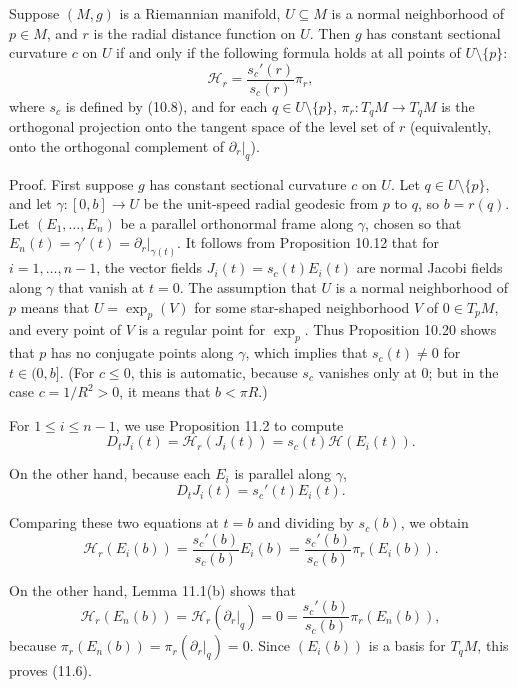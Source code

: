 \begin{proposition}[]
\label{prop:hessian-radial-distance-constant-curvature}
Suppose $(M, g)$ is a Riemannian manifold, $U \subseteq M$ is a normal neighborhood of $p \in M$, and $r$ is the radial distance function on $U$. Then $g$ has constant sectional curvature $c$ on $U$ if and only if the following formula holds at all points of $U \setminus \{p\}$:
\begin{equation}
\mathcal{H}_r = \frac{s_c'(r)}{s_c(r)}\pi_r, \tag{11.6}
\end{equation}
where $s_c$ is defined by (10.8), and for each $q \in U \setminus \{p\}$, $\pi_r : T_q M \to T_q M$ is the orthogonal projection onto the tangent space of the level set of $r$ (equivalently, onto the orthogonal complement of $\partial_r|_q$).
\end{proposition}

Proof. First suppose $g$ has constant sectional curvature $c$ on $U$. Let $q \in U \setminus \{p\}$, and let $\gamma : [0, b] \to U$ be the unit-speed radial geodesic from $p$ to $q$, so $b = r(q)$. Let $(E_1,\ldots, E_n)$ be a parallel orthonormal frame along $\gamma$, chosen so that $E_n(t) = \gamma'(t) = \partial_r|_{\gamma(t)}$. It follows from Proposition 10.12 that for $i = 1, \ldots, n-1$, the vector fields $J_i(t) = s_c(t)E_i(t)$ are normal Jacobi fields along $\gamma$ that vanish at $t = 0$. The assumption that $U$ is a normal neighborhood of $p$ means that $U = \exp_p(V)$ for some star-shaped neighborhood $V$ of $0 \in T_p M$, and every point of $V$ is a regular point for $\exp_p$. Thus Proposition 10.20 shows that $p$ has no conjugate points along $\gamma$, which implies that $s_c(t) \neq 0$ for $t \in (0, b]$. (For $c \le 0$, this is automatic, because $s_c$ vanishes only at $0$; but in the case $c = 1/R^2 > 0$, it means that $b < \pi R$.)

For $1 \le i \le n-1$, we use Proposition 11.2 to compute
$$D_t J_i(t) = \mathcal{H}_r(J_i(t)) = s_c(t)\mathcal{H}(E_i(t)).$$

On the other hand, because each $E_i$ is parallel along $\gamma$,
$$D_t J_i(t) = s_c'(t)E_i(t).$$

Comparing these two equations at $t = b$ and dividing by $s_c(b)$, we obtain
$$\mathcal{H}_r(E_i(b)) = \frac{s_c'(b)}{s_c(b)}E_i(b) = \frac{s_c'(b)}{s_c(b)}\pi_r(E_i(b)).$$

On the other hand, Lemma 11.1(b) shows that
$$\mathcal{H}_r(E_n(b)) = \mathcal{H}_r(\partial_r|_q) = 0 = \frac{s_c'(b)}{s_c(b)}\pi_r(E_n(b)),$$
because $\pi_r(E_n(b)) = \pi_r(\partial_r|_q) = 0$. Since $(E_i(b))$ is a basis for $T_q M$, this proves (11.6).

